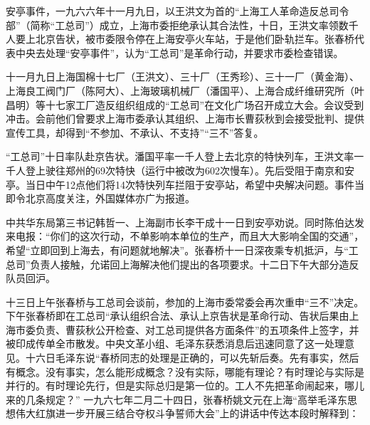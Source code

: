 \begin{maonote}
安亭事件，一九六六年十一月九日，以王洪文为首的“上海工人革命造反总司令部”（简称“工总司”）成立，上海市委拒绝承认其合法性，十日，王洪文率领数千人要上北京告状，被市委限令停在上海安亭火车站，于是他们卧轨拦车。张春桥代表中央去处理“安亭事件”，认为“工总司”是革命行动，并要求市委检查错误。

十一月九日上海国棉十七厂（王洪文）、三十厂（王秀珍）、三十一厂（黄金海）、上海良工阀门厂（陈阿大）、上海玻璃机械厂（潘国平）、上海合成纤维研究所（叶昌明）等十七家工厂造反组织组成的“工总司”在文化广场召开成立大会。会议受到冲击。会前他们曾要求上海市委承认其组织、上海市长曹荻秋到会接受批判、提供宣传工具，却得到“不参加、不承认、不支持”“三不”答复。

“工总司”十日率队赴京告状。潘国平率一千人登上去北京的特快列车，王洪文率一千人登上驶往郑州的69次特快（运行中被改为602次慢车）。先后受阻于南京和安亭。当日中午12点他们将14次特快列车拦阻于安亭站，希望中央解决问题。事件当即令北京高度关注，外国媒体亦广为报道。

中共华东局第三书记韩哲一、上海副市长李干成十一日到安亭劝说。同时陈伯达发来电报：“你们的这次行动，不单影响本单位的生产，而且大大影响全国的交通”，希望“立即回到上海去，有问题就地解决”。张春桥十一日深夜乘专机抵沪，与“工总司”负责人接触，允诺回上海解决他们提出的各项要求。十二日下午大部分造反队员回沪。

十三日上午张春桥与工总司会谈前，参加的上海市委常委会再次重申“三不”决定。下午张春桥即在工总司“承认组织合法、承认上京告状是革命行动、告状后果由上海市委负责、曹荻秋公开检查、对工总司提供各方面条件”的五项条件上签字，并被印成传单全市散发。中央文革小组、毛泽东获悉消息后迅速同意了这一处理意见。十六日毛泽东说“春桥同志的处理是正确的，可以先斩后奏。先有事实，然后有概念。没有事实，怎么能形成概念？没有实际，哪能有理论？有时理论与实际是并行的。有时理论先行，但是实际总归是第一位的。工人不先把革命闹起来，哪儿来的几条规定？”
一九六七年二月二十四日，张春桥姚文元在上海“高举毛泽东思想伟大红旗进一步开展三结合夺权斗争誓师大会”上的讲话中传达本段时解释到：


\end{maonote}
